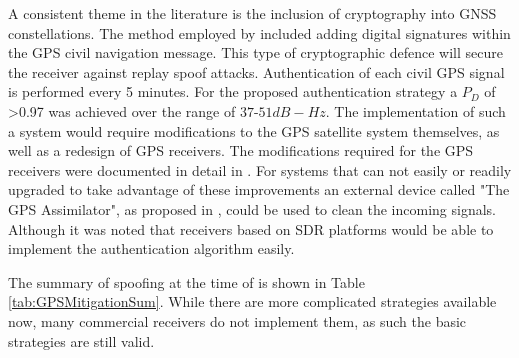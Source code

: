 A consistent theme in the literature is the inclusion of cryptography into GNSS constellations. The method employed by \citeauthor{RN13} included adding digital signatures within the GPS civil navigation message. This type of cryptographic defence
will secure the receiver against replay spoof attacks. Authentication of each civil GPS signal is performed every 5 minutes.
For the proposed authentication strategy a $P_D$ of >0.97 was achieved over the range of $37$-$51 dB-Hz$.
The implementation of such a system would require modifications to the GPS satellite system themselves, as well as a redesign of GPS receivers.
The modifications required for the GPS receivers were documented in detail in \cite{RN13}. For systems that can not easily or readily upgraded to
take advantage of these improvements an external device called "The GPS Assimilator", as proposed in \cite{RN19}, could be used to clean the incoming
signals.
Although it was noted that receivers based on SDR platforms would be able to implement the authentication algorithm easily. 

The summary of spoofing at the time of \cite{RN11} is shown in Table \ref{tab:GPSMitigationSum}. While there are more complicated strategies available now, many
commercial receivers do not implement them, as such the basic strategies are still valid.

